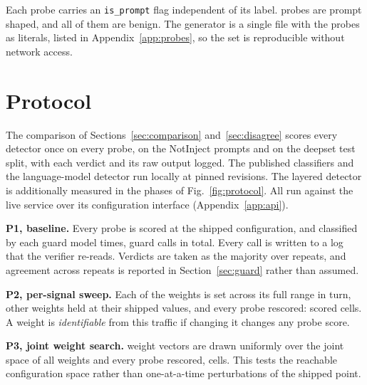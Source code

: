 \documentclass[conference]{IEEEtran}
\begin{document}
Each probe carries an \texttt{is\_prompt} flag independent of its label.
\NPromptShaped{} probes are prompt shaped, and all of them are benign. The
generator is a single file with the probes as literals, listed in
Appendix~\ref{app:probes}, so the set is reproducible without network access.

\begin{table}[t]
\centering
\caption{Probe set composition. The prompt-shaped column is the second
ground-truth axis and is independent of the label.}
\label{tab:probes}
\footnotesize

\end{table}

\section{Protocol}\label{sec:protocol}

The comparison of Sections~\ref{sec:comparison} and~\ref{sec:disagree}
scores every detector once on every probe, on the \NNotInjectItems{} NotInject
prompts and on the deepset test split, with each verdict and its raw output
logged. The published classifiers and the language-model detector run
locally at pinned revisions. The layered detector is additionally measured in
the phases of Fig.~\ref{fig:protocol}. All run against the live
service over its configuration interface (Appendix~\ref{app:api}).

\textbf{P1, baseline.} Every probe is scored at the shipped configuration, and
classified by each guard model \NRepeats{} times, \NGuardCalls{} guard calls in
total. Every call is written to a log that the verifier re-reads. Verdicts are
taken as the majority over repeats, and agreement across repeats is reported in
Section~\ref{sec:guard} rather than assumed.

\textbf{P2, per-signal sweep.} Each of the \NSignalsTotal{} weights is set
across its full range in turn, other weights held at their shipped values, and
every probe rescored: \NSweepCells{} scored cells. A weight is
\emph{identifiable} from this traffic if changing it changes any probe score.

\textbf{P3, joint weight search.} \NSearchConfigs{} weight vectors are drawn
uniformly over the joint space of all \NSignalsTotal{} weights and every probe
rescored, \NSearchCells{} cells. This tests the reachable configuration space
rather than one-at-a-time perturbations of the shipped point.
\end{document}
